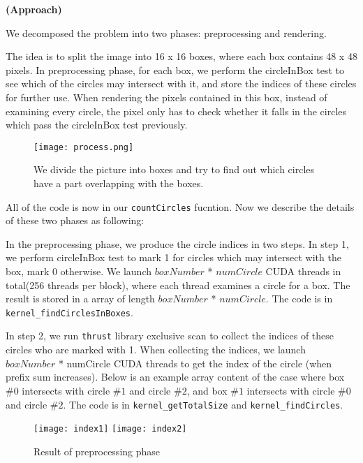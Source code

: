 \documentclass[11pt]{article}
\begin{document}

\textbf{(Approach)}

We decomposed the problem into two phases: preprocessing and rendering.

The idea is to split the image into 16 x 16 boxes, where each box contains 48 x 48 pixels. In preprocessing phase, for each box, we perform the circleInBox test to see which of the circles may intersect with it, and store the indices of these circles for further use. When rendering the pixels contained in this box, instead of examining every circle, the pixel only has to check whether it falls in the circles which pass the circleInBox test previously.

\begin{figure}[H]
\centering
   \texttt{[image: process.png]}
   \caption{We divide the picture into boxes and try to find out which circles have a part overlapping with the boxes.}
\end{figure}


All of the code is now in our \texttt{countCircles} fucntion. Now we describe the details of these two phases as following:

In the preprocessing phase, we produce the circle indices in two steps.
In step 1, we perform circleInBox test to mark 1 for circles which may intersect with the box, mark 0 otherwise.
We launch $boxNumber$ * $numCircle$ CUDA threads in total(256 threads per block), where each thread examines a circle for a box.
The result is stored in a array of length $boxNumber$ * $numCircle$.
The code is in \texttt{kernel\_findCirclesInBoxes}.

In step 2, we run \texttt{thrust} library exclusive scan to collect the indices of these circles who are marked with 1.
When collecting the indices, we launch $boxNumber$ * numCircle CUDA threads to get the index of the circle (when prefix sum increases).
Below is an example array content of the case where box $\#0$ intersects with circle $\#1$ and circle $\#2$, and box $\#1$ intersects with circle $\#0$ and circle $\#2$.
The code is in \texttt{kernel\_getTotalSize} and \texttt{kernel\_findCircles}.

\begin{figure}[h!]
\centering
   \texttt{[image: index1]}
   \texttt{[image: index2]}
   \caption{Result of preprocessing phase }
\end{figure}
\end{document}

